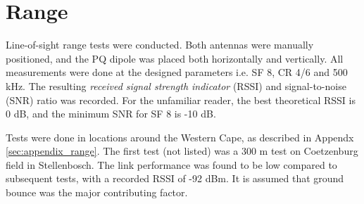 \graphicspath{{./figures}}

\section{Range}

Line-of-sight range tests were conducted. Both antennas were manually positioned, and the PQ dipole was placed both horizontally and vertically. All measurements were done at the designed parameters i.e. SF 8, CR 4/6 and 500 kHz. The resulting \textit{received signal strength indicator} (RSSI) and signal-to-noise (SNR) ratio was recorded. For the unfamiliar reader, the best theoretical RSSI is 0 dB, and the minimum SNR for SF 8 is -10 dB.

Tests were done in locations around the Western Cape, as described in Appendx \ref{sec:appendix_range}. The first test (not listed) was a 300 m test on Coetzenburg field in Stellenbosch. The link performance was found to be low compared to subsequent tests, with a recorded RSSI of -92 dBm. It is assumed that ground bounce was the major contributing factor.

